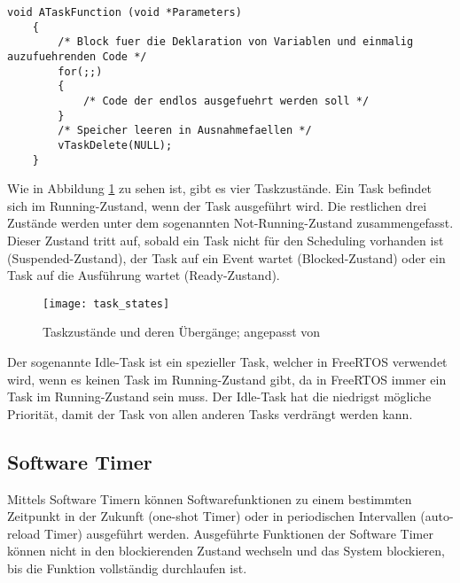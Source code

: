 \begin{lstlisting}[caption={[Minimaler Aufbau eines Tasks]Minimaler Aufbau eines Tasks; angepasst von \cite[S.~47]{barryFreeRTOS}}, label={lst:minimalTask}, style=generalStyle]
    void ATaskFunction (void *Parameters)
    {
        /* Block fuer die Deklaration von Variablen und einmalig auzufuehrenden Code */
        for(;;)
        {
            /* Code der endlos ausgefuehrt werden soll */
        }
        /* Speicher leeren in Ausnahmefaellen */
        vTaskDelete(NULL);
    }
\end{lstlisting}

Wie in Abbildung \ref{fig:taskStates} zu sehen ist, gibt es vier Taskzustände. Ein Task befindet sich im Running-Zustand, wenn der Task ausgeführt wird. Die restlichen drei Zustände werden unter dem sogenannten Not-Running-Zustand zusammengefasst. Dieser Zustand tritt auf, sobald ein Task nicht für den Scheduling vorhanden ist (Suspended-Zustand), der Task auf ein Event wartet (Blocked-Zustand) oder ein Task auf die Ausführung wartet (Ready-Zustand). \cites[S.~55]{barryFreeRTOS}[S.~65f.]{barryFreeRTOS}

\begin{figure}[h]
    \centering
    \texttt{[image: task\_states]}
    \caption{Taskzustände und deren Übergänge; angepasst von \cite[S.~67]{barryFreeRTOS}}
    \label{fig:taskStates}
\end{figure}

Der sogenannte Idle-Task ist ein spezieller Task, welcher in FreeRTOS verwendet wird, wenn es keinen Task im Running-Zustand gibt, da in FreeRTOS immer ein Task im Running-Zustand sein muss. Der Idle-Task hat die niedrigst mögliche Priorität, damit der Task von allen anderen Tasks verdrängt werden kann. \cite[S.~76]{barryFreeRTOS}

\subsection{Software Timer}
Mittels Software Timern können Softwarefunktionen zu einem bestimmten Zeitpunkt in der Zukunft (one-shot Timer) oder in periodischen Intervallen (auto-reload Timer) ausgeführt werden. Ausgeführte Funktionen der Software Timer können nicht in den blockierenden Zustand wechseln und das System blockieren, bis die Funktion vollständig durchlaufen ist. \cites[S.~149]{barryFreeRTOS}[S.~151]{barryFreeRTOS}{freeRTOSTimer}

